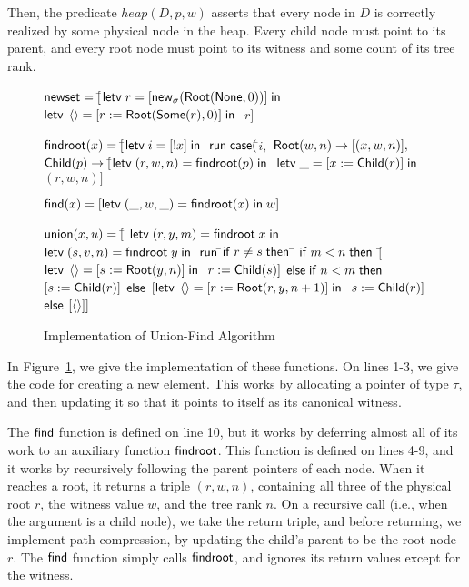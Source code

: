Then, the predicate $\mathit{heap}(D, p, w)$ asserts that every node
in $D$ is correctly realized by some physical node in the heap. Every
child node must point to its parent, and every root node must point 
to its witness and some count of its tree rank. 

\begin{figure}
\mbox{}
\begin{specification}
\nextline $\mathsf{newset} = [$\=$\mathsf{letv}\;r = [\mathsf{new}_{\sigma}(\mathsf{Root}(\mathsf{None}, 0))]\;\mathsf{in}\;$
\nextline              \>$\mathsf{letv}\;\left<\right> = [r := \mathsf{Root}(\mathsf{Some}(r), 0)]\;\mathsf{in}\;$
\nextline              \>$r]$

\nextline[1em] $\mathsf{findroot}(x) = [$\=$
                  \mathsf{letv}\;i = [!x]\;\mathsf{in}\;$ 
\nextline \>     $\mathsf{run}\;{}\mathsf{case}($\=$i,$ 
\nextline \> \>     $\mathsf{Root}(w, n) \to [(x, w, n)],$
\nextline \> \>     $\mathsf{Child}(p) \to [$\=$\mathsf{letv}\;(r, w, n) = \mathsf{findroot}(p)\;\mathsf{in}\;$ 
\nextline \> \>                      \>$\mathsf{letv}\;\_ = [x := \mathsf{Child}(r)]\;\mathsf{in}\;$ 
\nextline \> \>                      \>$(r,w,n)]$

\nextline[1em] $\mathsf{find}(x) = [\mathsf{letv}\;(\_, w, \_) = \mathsf{findroot}(x)\;\mathsf{in}\;w]$ 

\nextline[1em] $\mathsf{union}(x, u) = [$\= 
             $\mathsf{letv}\;(r, y, m) = \mathsf{findroot}\;x\;\mathsf{in}\;$ 
\nextline \> $\mathsf{letv}\;(s, v, n) = \mathsf{findroot}\;y\;\mathsf{in}\;$ 
\nextline \> $\mathsf{run}\;{}$\=$\mathsf{if}\;r \not= s\;\mathsf{then}$ 
\nextline \>\>\;\;\=   $\mathsf{if}\;m < n\;\mathsf{then}$ 
\nextline \>\> \>   \;\;$[$\=$\mathsf{letv}\;\left<\right> = [s := \mathsf{Root}(y, n)]\;\mathsf{in}\;$ 
\nextline \>\> \>         \>$r := \mathsf{Child}(s)]$ 
\nextline \>\> \> $\mathsf{else}\;\mathsf{if}\;n < m\;\mathsf{then}$ 
\nextline \>\> \>   \;\;$[s := \mathsf{Child}(r)]$
\nextline \>\> \> $\mathsf{else}$ 
\nextline \>\> \>   \;\;$[\mathsf{letv}\;\left<\right> = [r := \mathsf{Root}(r, y, n+1)]\;\mathsf{in}\;$
\nextline \>\> \>      \>$s := \mathsf{Child}(r)]$
\nextline \>\> $\mathsf{else}$ 
\nextline \>\> \> $[\left<\right>]]$
\end{specification}
\caption{Implementation of Union-Find Algorithm}
\label{union-find:impl}  
\end{figure}

In Figure~\ref{union-find:impl}, we give the implementation of these functions. 
On lines 1-3, we give the code for creating a new element. This works by allocating
a pointer of type $\tau$, and then updating it so that it points to itself as its
canonical witness. 

The $\mathsf{find}$ function is defined on line 10, but it works by deferring
almost all of its work to an auxiliary function $\mathsf{findroot}$. This
function is defined on lines 4-9, and it works by recursively
following the parent pointers of each node. When it reaches a root, it
returns a triple $(r, w, n)$, containing all three of the physical
root $r$, the witness value $w$, and the tree rank $n$. On a
recursive call (i.e., when the argument is a child node), we take the
return triple, and before returning, we implement path compression, by
updating the child's parent to be the root node $r$.  The $\mathsf{find}$
function simply calls $\mathsf{findroot}$, and ignores its return values
except for the witness.

